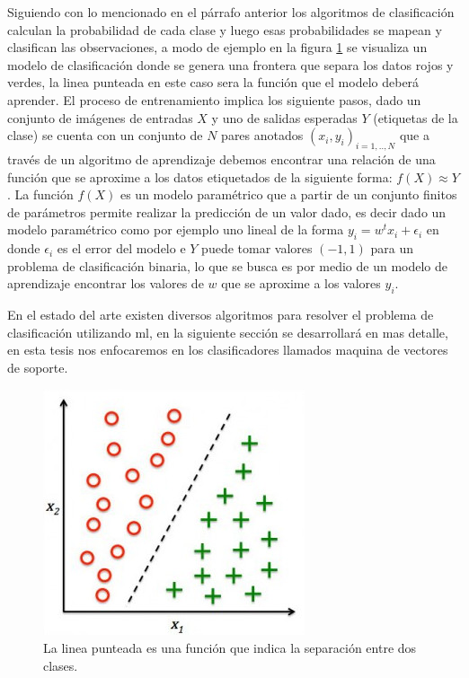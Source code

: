 Siguiendo con lo mencionado en el párrafo anterior los algoritmos de clasificación calculan la probabilidad de cada clase y luego esas probabilidades se mapean y  clasifican las observaciones, a modo de ejemplo en la figura \ref{Fig:clasificacion} se visualiza un modelo de clasificación donde se  genera una frontera que separa los datos rojos y verdes, la linea punteada en este caso sera la función que el modelo deberá aprender. El proceso de entrenamiento implica los siguiente pasos, dado un conjunto de imágenes de entradas $X$ y uno de salidas esperadas $Y$ (etiquetas de la clase) se cuenta con un conjunto de $N$ pares anotados ${(x_i, y_i)}_{i=1,..,N}$  que a través de un algoritmo de aprendizaje debemos encontrar una relación de una función que se aproxime a los datos etiquetados de la siguiente forma: $f(X) ≈ Y$. La función $f(X)$ es un modelo paramétrico que a partir de un conjunto finitos de parámetros permite realizar la predicción de un valor dado, es decir dado un modelo paramétrico como por ejemplo uno lineal de la forma $y_i = w^t x_i + \epsilon_i$ en donde $\epsilon_i$ es el error del modelo e $Y$ puede tomar valores $(-1,1)$ para un problema de clasificación binaria, lo que se busca es por medio de un modelo de aprendizaje encontrar los valores de  $w$ que se aproxime a los valores $y_i$.

En el estado del arte existen diversos algoritmos para resolver el problema de clasificación utilizando \ac{ml}, en la siguiente sección se desarrollará en mas detalle, en esta tesis nos enfocaremos en los clasificadores llamados maquina de vectores de soporte. 

\begin{figure}[H] \centering
  \includegraphics[scale=0.4,keepaspectratio=true,clip=true]{imagenes/MarcoTeorico/classification.jpg}
  \caption{La linea punteada es una función que indica la separación entre dos clases.}\label{Fig:clasificacion}
\end{figure}




